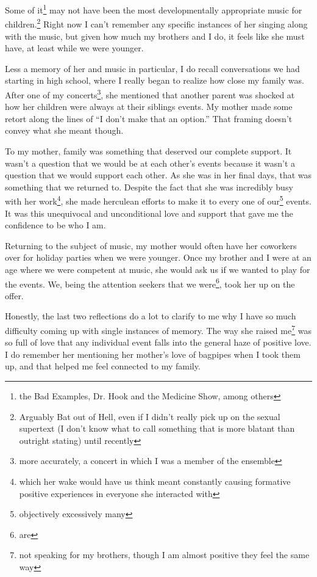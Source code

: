 \documentclass[12pt]{article}[titlepage]
\newcommand{\say}[1]{``#1''}
\newcommand{\1}{\={a}}
\newcommand{\2}{\={e}}
\newcommand{\3}{\={\i}}
\newcommand{\4}{\=o}
\newcommand{\5}{\=u}
\newcommand{\6}{\={A}}
\renewcommand{\,}{\textsuperscript{,}}
\begin{document}
Some of it\footnote{the Bad Examples, Dr. Hook and the Medicine Show, among others} may not have been the most developmentally appropriate music for children.\footnote{Arguably Bat out of Hell, even if I didn't really pick up on the sexual supertext (I don't know what to call something that is more blatant than outright stating) until recently}  
Right now I can't remember any specific instances of her singing along with the music, but given how much my brothers and I do, it feels like she must have, at least while we were younger.

Less a memory of her and music in particular, I do recall conversations we had starting in high school, where I really began to realize how close my family was.  
After one of my concerts\footnote{more accurately, a concert in which I was a member of the ensemble}, she mentioned that another parent was shocked at how her children were always at their siblings events.  
My mother made some retort along the lines of \say{I don't make that an option.}  
That framing doesn't convey what she meant though.

To my mother, family was something that deserved our complete support.  
It wasn't a question that we would be at each other's events because it wasn't a question that we would support each other.  
As she was in her final days, that was something that we returned to.  
Despite the fact that she was incredibly busy with her work\footnote{which her wake would have us think meant constantly causing formative positive experiences in everyone she interacted with}, she made herculean efforts to make it to every one of our\footnote{objectively excessively many} events.  
It was this unequivocal and unconditional love and support that gave me the confidence to be who I am.

Returning to the subject of music, my mother would often have her coworkers over for holiday parties when we were younger.  
Once my brother and I were at an age where we were competent at music, she would ask us if we wanted to play for the events.  
We, being the attention seekers that we were\footnote{are}, took her up on the offer.

Honestly, the last two reflections do a lot to clarify to me why I have so much difficulty coming up with single instances of memory.  
The way she raised me\footnote{not speaking for my brothers, though I am almost positive they feel the same way} was so full of love that any individual event falls into the general haze of positive love.  
I do remember her mentioning her mother's love of bagpipes when I took them up, and that helped me feel connected to my family.
\end{document}
